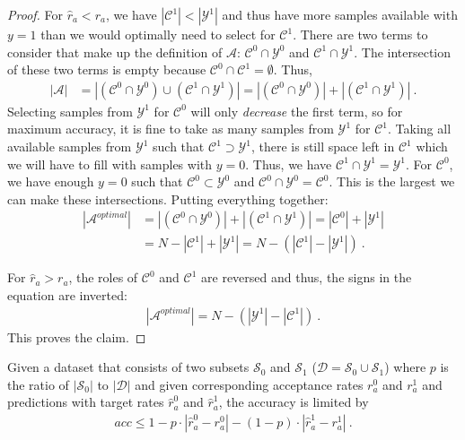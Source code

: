 \begin{proof}
  For $\hat{r}_a < r_a$, we have $\left|\mathcal{C}^1\right| < \left|\mathcal{Y}^1\right|$
  and thus have more samples available with $y = 1$ than we would optimally need to select for $\mathcal{C}^1$.
  There are two terms to consider that make up the definition of $\mathcal{A}$:
  $\mathcal{C}^0 \cap \mathcal{Y}^0$ and $\mathcal{C}^1\cap \mathcal{Y}^1$.
  The intersection of these two terms is empty because $\mathcal{C}^0\cap \mathcal{C}^1 = \emptyset$.
  Thus,
  \begin{align}
    \left|\mathcal{A}\right| &= \left|(\mathcal{C}^0\cap\mathcal{Y}^0) \cup (\mathcal{C}^1\cap\mathcal{Y}^1)\right|
    = \left|(\mathcal{C}^0\cap\mathcal{Y}^0)\right| + \left|(\mathcal{C}^1\cap\mathcal{Y}^1)\right|~.
  \end{align}
  Selecting samples from $\mathcal{Y}^1$ for $\mathcal{C}^0$ will only \emph{decrease} the first term,
  so for maximum accuracy, it is fine to take as many samples from $\mathcal{Y}^1$ for $\mathcal{C}^1$.
  Taking all available samples from $\mathcal{Y}^1$ such that $\mathcal{C}^1 \supset \mathcal{Y}^1$,
  there is still space left in $\mathcal{C}^1$ which we will have to fill with samples with $y=0$.
  Thus, we have $\mathcal{C}^1\cap \mathcal{Y}^1 = \mathcal{Y}^1$.
  For $\mathcal{C}^0$, we have enough $y=0$ such that
  $\mathcal{C}^0\subset \mathcal{Y}^0$ and $\mathcal{C}^0\cap \mathcal{Y}^0 = \mathcal{C}^0$.
  This is the largest we can make these intersections.
  Putting everything together:
  \begin{align}
    \left|\mathcal{A}^\mathit{optimal}\right|
    &= \left|(\mathcal{C}^0\cap\mathcal{Y}^0)\right| + \left|(\mathcal{C}^1\cap\mathcal{Y}^1)\right|
     = \left|\mathcal{C}^0\right| + \left|\mathcal{Y}^1\right|\nonumber\\
    &= N - \left|\mathcal{C}^1\right| + \left|\mathcal{Y}^1\right|
     = N - \left(\left|\mathcal{C}^1\right| - \left|\mathcal{Y}^1\right|\right)~.
  \end{align}

  For $\hat{r}_a > r_a$, the roles of $\mathcal{C}^0$ and $\mathcal{C}^1$ are reversed
  and thus, the signs in the equation are inverted:
  \begin{align}
    \left|\mathcal{A}^\mathit{optimal}\right| = N  - (\left|\mathcal{Y}^1\right| - \left|\mathcal{C}^1\right|)~.
  \end{align}
  This proves the claim.
\end{proof}
\begin{corollary}
  Given a dataset that consists of two subsets $\mathcal{S}_0$
  and $\mathcal{S}_1$ ($\mathcal{D} = \mathcal{S}_0 \cup \mathcal{S}_1$)
  where $p$ is the ratio of $|\mathcal{S}_0|$ to $|\mathcal{D}|$
  and given corresponding acceptance rates $r^0_a$ and $r^1_a$
  and predictions with target rates $\hat{r}^0_a$ and $\hat{r}^1_a$,
  the accuracy is limited by
  \begin{align}
    \mathit{acc} \leq 1 - p\cdot\left| \hat{r}^0_a -r^0_a \right| - (1-p)\cdot\left| \hat{r}^1_a -r^1_a \right|~.
  \end{align}
\end{corollary}

